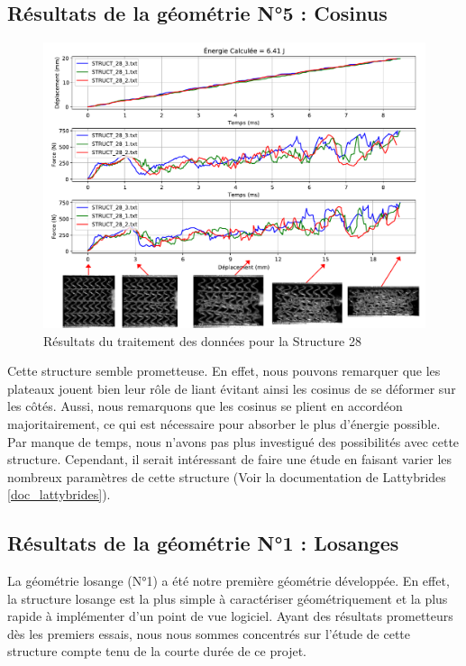 \documentclass[a4paper]{article}
\begin{document}
	\subsection{Résultats de la géométrie N°5 : Cosinus}
	\begin{figure}[H]
		\centering
		\includegraphics[width=16cm]{Images/7/7_3/STRUCT_28_AVECRUPTURE.pdf}
		\caption{Résultats du traitement des données pour la Structure 28}
	\end{figure}
	
	\hspace{0.5cm}Cette structure semble prometteuse. En effet, nous pouvons remarquer que les plateaux jouent bien leur rôle de liant évitant ainsi les cosinus de se déformer sur les côtés. Aussi, nous remarquons que les cosinus se plient en accordéon majoritairement, ce qui est nécessaire pour absorber le plus d'énergie possible.\\
	
	Par manque de temps, nous n'avons pas plus investigué des possibilités avec cette structure. Cependant, il serait intéressant de faire une étude en faisant varier les nombreux paramètres de cette structure (Voir la documentation de Lattybrides \ref{doc_lattybrides}).
	\newpage
	
	\subsection{Résultats de la géométrie N°1 : Losanges}
	\hspace{0.5cm}La géométrie losange (N°1) a été notre première géométrie développée. En effet, la structure losange est la plus simple à caractériser géométriquement et la plus rapide à implémenter d'un point de vue logiciel. Ayant des résultats prometteurs dès les premiers essais, nous nous sommes concentrés sur l'étude de cette structure compte tenu de la courte durée de ce projet.
	
\end{document}
